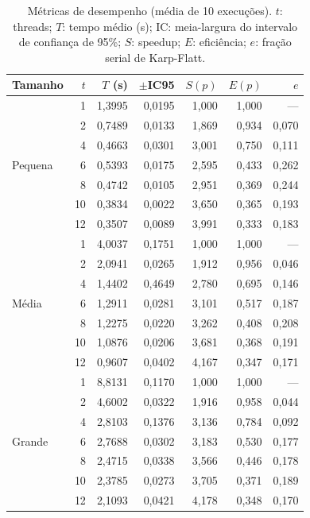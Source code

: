 \documentclass[12pt]{article}
\begin{document}
\begin{table}[ht]
\centering
\caption{Métricas de desempenho (média de 10 execuções). $t$: threads;
  $T$: tempo médio (s); IC: meia-largura do intervalo de confiança de 95\%;
  $S$: speedup; $E$: eficiência; $e$: fração serial de Karp-Flatt.}
\label{tab:metricas}
\small
\begin{tabular}{@{}lrrrrrr@{}}
\toprule
Tamanho & $t$ & $T$ (s) & $\pm$IC95 & $S(p)$ & $E(p)$ & $e$ \\
\midrule
\multirow{7}{*}{Pequena}
 &  1 & 1,3995 & 0,0195 & 1,000 & 1,000 & --- \\
 &  2 & 0,7489 & 0,0133 & 1,869 & 0,934 & 0,070 \\
 &  4 & 0,4663 & 0,0301 & 3,001 & 0,750 & 0,111 \\
 &  6 & 0,5393 & 0,0175 & 2,595 & 0,433 & 0,262 \\
 &  8 & 0,4742 & 0,0105 & 2,951 & 0,369 & 0,244 \\
 & 10 & 0,3834 & 0,0022 & 3,650 & 0,365 & 0,193 \\
 & 12 & 0,3507 & 0,0089 & 3,991 & 0,333 & 0,183 \\
\midrule
\multirow{7}{*}{Média}
 &  1 & 4,0037 & 0,1751 & 1,000 & 1,000 & --- \\
 &  2 & 2,0941 & 0,0265 & 1,912 & 0,956 & 0,046 \\
 &  4 & 1,4402 & 0,4649 & 2,780 & 0,695 & 0,146 \\
 &  6 & 1,2911 & 0,0281 & 3,101 & 0,517 & 0,187 \\
 &  8 & 1,2275 & 0,0220 & 3,262 & 0,408 & 0,208 \\
 & 10 & 1,0876 & 0,0206 & 3,681 & 0,368 & 0,191 \\
 & 12 & 0,9607 & 0,0402 & 4,167 & 0,347 & 0,171 \\
\midrule
\multirow{7}{*}{Grande}
 &  1 & 8,8131 & 0,1170 & 1,000 & 1,000 & --- \\
 &  2 & 4,6002 & 0,0322 & 1,916 & 0,958 & 0,044 \\
 &  4 & 2,8103 & 0,1376 & 3,136 & 0,784 & 0,092 \\
 &  6 & 2,7688 & 0,0302 & 3,183 & 0,530 & 0,177 \\
 &  8 & 2,4715 & 0,0338 & 3,566 & 0,446 & 0,178 \\
 & 10 & 2,3785 & 0,0273 & 3,705 & 0,371 & 0,189 \\
 & 12 & 2,1093 & 0,0421 & 4,178 & 0,348 & 0,170 \\
\bottomrule
\end{tabular}
\end{table}
\end{document}
